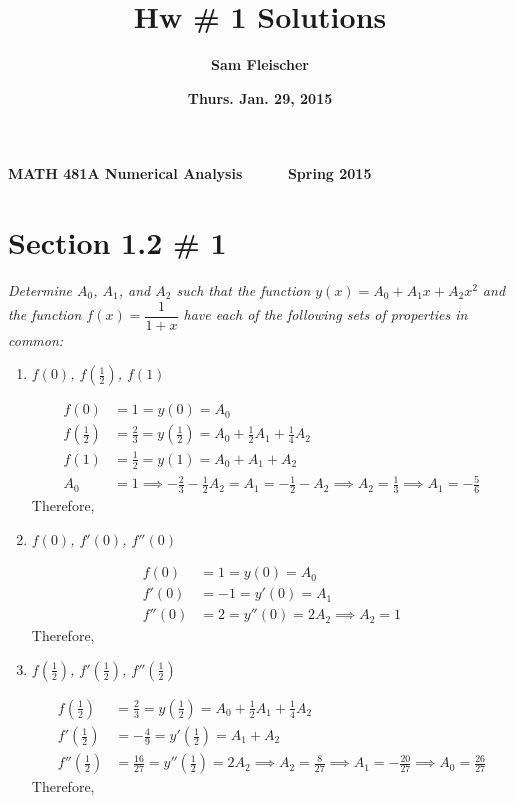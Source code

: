 \documentclass[12pt]{article}
\begin{document}
{\bf MATH 481A \hfill Numerical Analysis \ \ \ \ \ \hfill Spring 2015}

\title{\bf Hw \# 1 Solutions}
\author{\bf Sam Fleischer}
\date{\bf Thurs. Jan. 29, 2015}

{\let\newpage\relax\maketitle}
\maketitle
\tableofcontents
\pagebreak

\section*{Section 1.2 \# 1}
{\it Determine $A_0$, $A_1$, and $A_2$ such that the function $y(x) = A_0 + A_1x + A_2x^2$ and the function $f(x) = \dfrac{1}{1 + x}$ have each of the following sets of properties in common:}

\begin{enumerate}[\ \ (a)\ \ ]

\item {\it $f(0)$, $f(\frac{1}{2})$, $f(1)$}
\begin{align*}
f(0) &= 1 = y(0) = A_0 \\
f(\tfrac{1}{2}) &= \tfrac{2}{3} = y(\tfrac{1}{2}) = A_0 + \tfrac{1}{2}A_1 + \tfrac{1}{4}A_2 \\
f(1) &= \tfrac{1}{2} = y(1) = A_0 + A_1 + A_2 \\
A_0 &= 1 \implies -\tfrac{2}{3} - \tfrac{1}{2}A_2 = A_1 = -\tfrac{1}{2} - A_2 \implies A_2 = \tfrac{1}{3} \implies A_1 = -\tfrac{5}{6}
\end{align*}
Therefore, 

\item {\it $f(0)$, $f'(0)$, $f''(0)$}
\begin{align*}
f(0) &= 1 = y(0) = A_0 \\
f'(0) &= -1 = y'(0) = A_1 \\
f''(0) &= 2 = y''(0) = 2A_2 \implies A_2 = 1
\end{align*}
Therefore, 

\item {\it $f(\tfrac{1}{2})$, $f'(\tfrac{1}{2})$, $f''(\tfrac{1}{2})$}
\begin{align*}
f(\tfrac{1}{2}) &= \tfrac{2}{3} = y(\tfrac{1}{2}) = A_0 + \tfrac{1}{2}A_1 + \tfrac{1}{4}A_2 \\
f'(\tfrac{1}{2}) &= -\tfrac{4}{9} = y'(\tfrac{1}{2}) = A_1 + A_2 \\
f''(\tfrac{1}{2}) &= \tfrac{16}{27} = y''(\frac{1}{2}) = 2A_2 \implies A_2 = \tfrac{8}{27} \implies A_1 = -\tfrac{20}{27} \implies A_0 = \tfrac{26}{27}
\end{align*}
Therefore, 

\end{enumerate}
\end{document}
